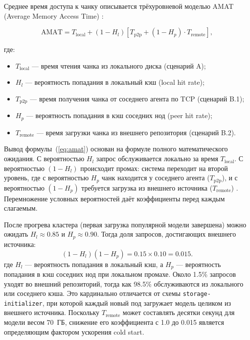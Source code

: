 Среднее время доступа к чанку описывается трёхуровневой моделью AMAT (Average Memory Access Time) \cite{hennessy2011ca}:

\begin{equation}
\mathrm{AMAT} = T_{\mathrm{local}} + (1-H_l)\left[T_{\mathrm{p2p}} + (1-H_p) \cdot T_{\mathrm{remote}}\right],
\label{eq:amat}
\end{equation}

где:
\begin{itemize}[leftmargin=*]
  \item $T_{\mathrm{local}}$ --- время чтения чанка из локального диска (сценарий A);
  \item $H_l$ --- вероятность попадания в локальный кэш (local hit rate);
  \item $T_{\mathrm{p2p}}$ --- время получения чанка от соседнего агента по TCP (сценарий B.1);
  \item $H_p$ --- вероятность попадания в кэш соседних нод (peer hit rate);
  \item $T_{\mathrm{remote}}$ --- время загрузки чанка из внешнего репозитория (сценарий B.2).
\end{itemize}

Вывод формулы~(\ref{eq:amat}) основан на формуле полного математического ожидания. С вероятностью $H_l$ запрос обслуживается локально за время $T_{\mathrm{local}}$. С вероятностью $(1-H_l)$ происходит промах: система переходит на второй уровень, где с вероятностью $H_p$ чанк находится у соседнего агента ($T_{\mathrm{p2p}}$), и с вероятностью $(1-H_p)$ требуется загрузка из внешнего источника ($T_{\mathrm{remote}}$) \cite{li2020caching}. Перемножение условных вероятностей даёт коэффициенты перед каждым слагаемым.

После прогрева кластера (первая загрузка популярной модели завершена) можно ожидать $H_l \approx 0.85$ и $H_p \approx 0.90$. Тогда доля запросов, достигающих внешнего источника:
\begin{equation}
(1-H_l)(1-H_p) = 0.15 \times 0.10 = 0.015.
\end{equation}
где $H_l$ --- вероятность попадания в локальный кэш, а $H_p$ --- вероятность попадания в кэш соседних нод при локальном промахе.
Около 1.5\% запросов уходят во внешний репозиторий, тогда как 98.5\% обслуживаются из локального или соседнего кэша. Это кардинально отличается от схемы \texttt{storage-initializer}, при которой каждый новый под загружает модель целиком из внешнего источника. Поскольку $T_{\mathrm{remote}}$ может составлять десятки секунд для модели весом 70~ГБ, снижение его коэффициента с 1.0 до 0.015 является определяющим фактором ускорения cold start.

